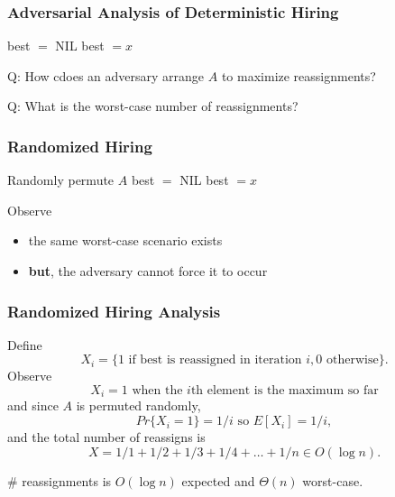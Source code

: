 \documentclass[10pt]{beamer}
\begin{document}
\begin{frame} \frametitle{Adversarial Analysis of Deterministic Hiring}
  {\footnotesize
  \begin{algorithmic}[1]
    \State best $ = $ NIL
        \State best $= x$
      \EndIf
    \EndFor
    \State {}
    \EndFunction
  \end{algorithmic}
  }
  \vspace{12pt}

  Q: How cdoes an adversary arrange $A$ to maximize reassignments?
  \vspace{12pt}

  Q: What is the worst-case number of reassignments?
\end{frame}

\begin{frame} \frametitle{Randomized Hiring}
  {\footnotesize
  \begin{algorithmic}[1]
    \State Randomly permute $A$ 
    \State best $ = $ NIL
        \State best $= x$
      \EndIf
    \EndFor
    \State {}
    \EndFunction
  \end{algorithmic}
  }
  \vspace{12pt}

  Observe
  \begin{itemize}
    \item the same worst-case scenario exists
    \item \textbf{but}, the adversary cannot force it to occur
  \end{itemize}
\end{frame}

\begin{frame} \frametitle{Randomized Hiring Analysis}
Define
\[ X_i = \{\text{1 if best is reassigned in iteration } i, 0 \text{ otherwise} \} .\]
Observe
\[ X_i = 1 \text{ when the } i\text{th element is the maximum so far} \]
and since $A$ is permuted randomly,
\[ Pr\{X_i=1\} = 1/i \text{ so } E[X_i] = 1/i, \]
and the total number of reassigns is
\[ X = 1/1 + 1/2 + 1/3 + 1/4 + \ldots + 1/n \in O(\log n). \]

\# reassignments is $O(\log n)$ expected and $\Theta(n)$ worst-case.
\end{frame}
\end{document}
